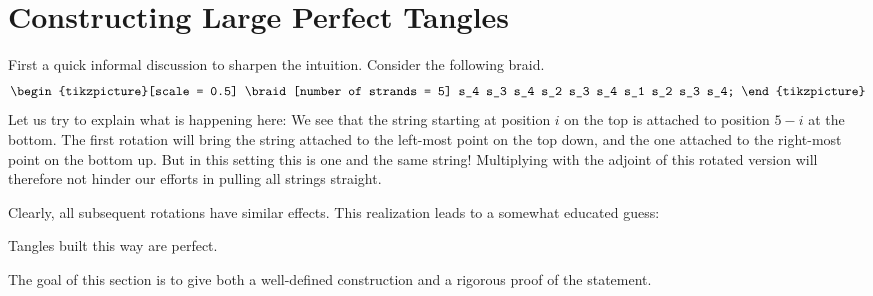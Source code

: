 %
%
\section{Constructing Large Perfect Tangles}\label{sec:FirstGeneralConstruction}
First a quick informal discussion to sharpen the intuition. Consider the following braid.
\begin{align*}
\begin{tikzpicture}[scale = 0.5]
\braid[number of strands = 5] s_4 s_3 s_4 s_2 s_3 s_4 s_1 s_2 s_3 s_4;
\end{tikzpicture}
\end{align*}
Let us try to explain what is happening here: We see that the string starting at position $i$ on the top is attached to position $5-i$ at the bottom. The first rotation will bring the string attached to the left-most point on the top down, and the one attached to the right-most point on the bottom up. But in this setting this is one and the same string! Multiplying with the adjoint of this rotated version will therefore not hinder our efforts in pulling all strings straight. 

Clearly, all subsequent rotations have similar effects. This realization leads to a somewhat educated guess: 
\begin{center}
Tangles built this way are perfect.
\end{center}
The goal of this section is to give both a well-defined construction and a rigorous proof of the statement.

